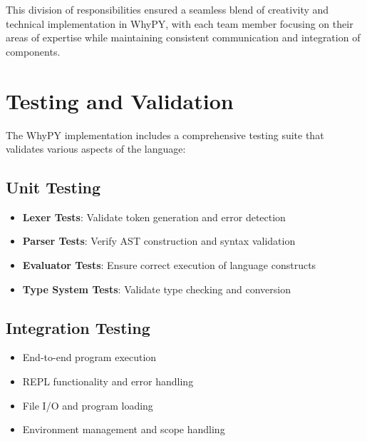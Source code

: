 \documentclass[11pt]{article}
\newenvironment{feature}
{\begin{tcolorbox}[
    colback=lightgray,
    colframe=primary,
    arc=0mm,
    boxrule=1pt
]}
{\end{tcolorbox}}
\begin{document}
This division of responsibilities ensured a seamless blend of creativity and technical implementation in WhyPY, with each team member focusing on their areas of expertise while maintaining consistent communication and integration of components.

\section{Testing and Validation}
\begin{feature}
The WhyPY implementation includes a comprehensive testing suite that validates various aspects of the language:

\subsection*{Unit Testing}
\begin{itemize}[label=\textcolor{primary}{\faCheck}]
    \item \textbf{Lexer Tests}: Validate token generation and error detection
    \item \textbf{Parser Tests}: Verify AST construction and syntax validation
    \item \textbf{Evaluator Tests}: Ensure correct execution of language constructs
    \item \textbf{Type System Tests}: Validate type checking and conversion
\end{itemize}

\subsection*{Integration Testing}
\begin{itemize}[label=\textcolor{primary}{\faCheck}]
    \item End-to-end program execution
    \item REPL functionality and error handling
    \item File I/O and program loading
    \item Environment management and scope handling
\end{itemize}
\end{feature}
\end{document}
